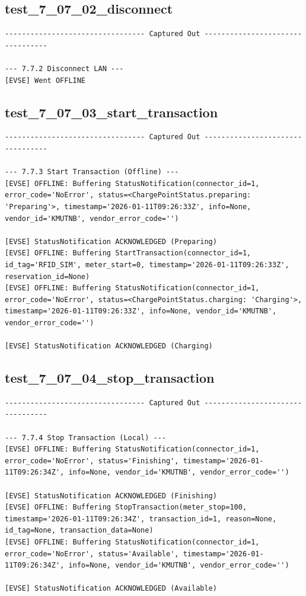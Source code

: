 \documentclass{article}
\begin{document}
\subsection*{test\_7\_07\_02\_disconnect}
\begin{lstlisting}
--------------------------------- Captured Out ---------------------------------

--- 7.7.2 Disconnect LAN ---
[EVSE] Went OFFLINE
\end{lstlisting}
\subsection*{test\_7\_07\_03\_start\_transaction}
\begin{lstlisting}
--------------------------------- Captured Out ---------------------------------

--- 7.7.3 Start Transaction (Offline) ---
[EVSE] OFFLINE: Buffering StatusNotification(connector_id=1, error_code='NoError', status=<ChargePointStatus.preparing: 'Preparing'>, timestamp='2026-01-11T09:26:33Z', info=None, vendor_id='KMUTNB', vendor_error_code='')

[EVSE] StatusNotification ACKNOWLEDGED (Preparing)
[EVSE] OFFLINE: Buffering StartTransaction(connector_id=1, id_tag='RFID_SIM', meter_start=0, timestamp='2026-01-11T09:26:33Z', reservation_id=None)
[EVSE] OFFLINE: Buffering StatusNotification(connector_id=1, error_code='NoError', status=<ChargePointStatus.charging: 'Charging'>, timestamp='2026-01-11T09:26:33Z', info=None, vendor_id='KMUTNB', vendor_error_code='')

[EVSE] StatusNotification ACKNOWLEDGED (Charging)
\end{lstlisting}
\subsection*{test\_7\_07\_04\_stop\_transaction}
\begin{lstlisting}
--------------------------------- Captured Out ---------------------------------

--- 7.7.4 Stop Transaction (Local) ---
[EVSE] OFFLINE: Buffering StatusNotification(connector_id=1, error_code='NoError', status='Finishing', timestamp='2026-01-11T09:26:34Z', info=None, vendor_id='KMUTNB', vendor_error_code='')

[EVSE] StatusNotification ACKNOWLEDGED (Finishing)
[EVSE] OFFLINE: Buffering StopTransaction(meter_stop=100, timestamp='2026-01-11T09:26:34Z', transaction_id=1, reason=None, id_tag=None, transaction_data=None)
[EVSE] OFFLINE: Buffering StatusNotification(connector_id=1, error_code='NoError', status='Available', timestamp='2026-01-11T09:26:34Z', info=None, vendor_id='KMUTNB', vendor_error_code='')

[EVSE] StatusNotification ACKNOWLEDGED (Available)
\end{lstlisting}
\end{document}
